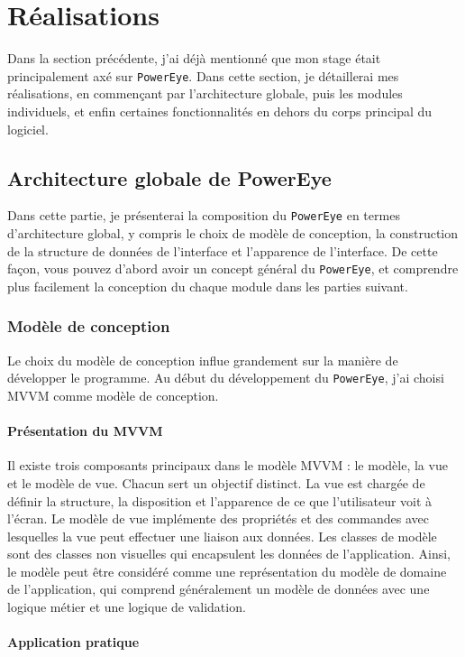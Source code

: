 \chapter{Réalisations}
Dans la section précédente, j'ai déjà mentionné que mon stage était principalement axé sur \texttt{PowerEye}. Dans cette section, je détaillerai mes réalisations, en commençant par l'architecture globale, puis les modules individuels, et enfin certaines fonctionnalités en dehors du corps principal du logiciel.
\section{Architecture globale de PowerEye}
Dans cette partie, je présenterai la composition du \texttt{PowerEye} en termes d'architecture global, y compris le choix de modèle de conception, la construction de la structure de données de l'interface et l'apparence de l'interface. De cette façon, vous pouvez d'abord avoir un concept général du \texttt{PowerEye}, et comprendre plus facilement la conception du chaque module dans les parties suivant.
\subsection{Modèle de conception}
Le choix du modèle de conception influe grandement sur la manière de développer le programme. Au début du développement du \texttt{PowerEye}, j'ai choisi MVVM comme modèle de conception.
\subsubsection{Présentation du MVVM}
Il existe trois composants principaux dans le modèle MVVM : le modèle, la vue et le modèle de vue. Chacun sert un objectif distinct. La vue est chargée de définir la structure, la disposition et l’apparence de ce que l’utilisateur voit à l’écran. Le modèle de vue implémente des propriétés et des commandes avec lesquelles la vue peut effectuer une liaison aux données. Les classes de modèle sont des classes non visuelles qui encapsulent les données de l’application. Ainsi, le modèle peut être considéré comme une représentation du modèle de domaine de l’application, qui comprend généralement un modèle de données avec une logique métier et une logique de validation. \\
\subsubsection{Application pratique}


